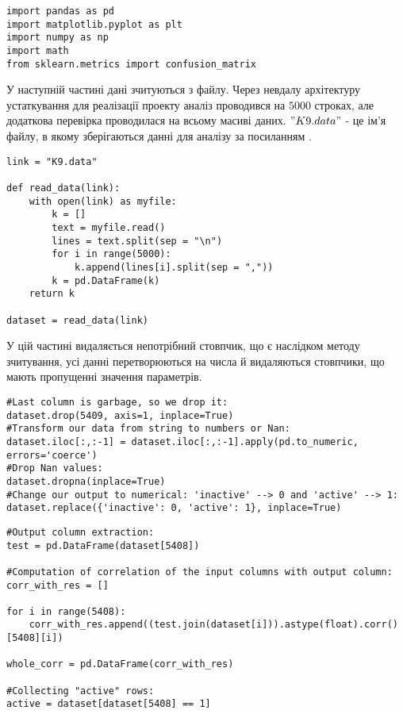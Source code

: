 \documentclass[12pt,a4paper]{article}
\theoremstyle{myplain}
\numberwithin{equation}{section}
\begin{document}
\begin{lstlisting}
import pandas as pd
import matplotlib.pyplot as plt
import numpy as np
import math
from sklearn.metrics import confusion_matrix
\end{lstlisting}

У наступній частині дані зчитуються з файлу. Через невдалу архітектуру устаткування для реалізації проекту аналіз проводився на $5000$ строках, але додаткова перевірка проводилася на всьому масиві даних. $"K9.data"$ - це ім'я файлу, в якому зберігаються данні для аналізу за посиланням \cite{Source}.

\begin{lstlisting}
link = "K9.data"

def read_data(link):
    with open(link) as myfile:
        k = []
        text = myfile.read()
        lines = text.split(sep = "\n")
        for i in range(5000):
            k.append(lines[i].split(sep = ","))
        k = pd.DataFrame(k)
    return k
    
dataset = read_data(link)
\end{lstlisting}

У цій частині видаляється непотрібний стовпчик, що є наслідком методу зчитування, усі данні перетворюються на числа й видаляються стовпчики, що мають пропущенні значення параметрів.

\pagebreak
{}
\begin{lstlisting}
#Last column is garbage, so we drop it:
dataset.drop(5409, axis=1, inplace=True)
#Transform our data from string to numbers or Nan:
dataset.iloc[:,:-1] = dataset.iloc[:,:-1].apply(pd.to_numeric, errors='coerce')
#Drop Nan values:
dataset.dropna(inplace=True)
#Change our output to numerical: 'inactive' --> 0 and 'active' --> 1:
dataset.replace({'inactive': 0, 'active': 1}, inplace=True)
\end{lstlisting}

\begin{lstlisting}
#Output column extraction:
test = pd.DataFrame(dataset[5408])

#Computation of correlation of the input columns with output column:
corr_with_res = []

for i in range(5408):
    corr_with_res.append((test.join(dataset[i])).astype(float).corr()[5408][i])

whole_corr = pd.DataFrame(corr_with_res)

#Collecting "active" rows:
active = dataset[dataset[5408] == 1]
\end{lstlisting}
\end{document}
